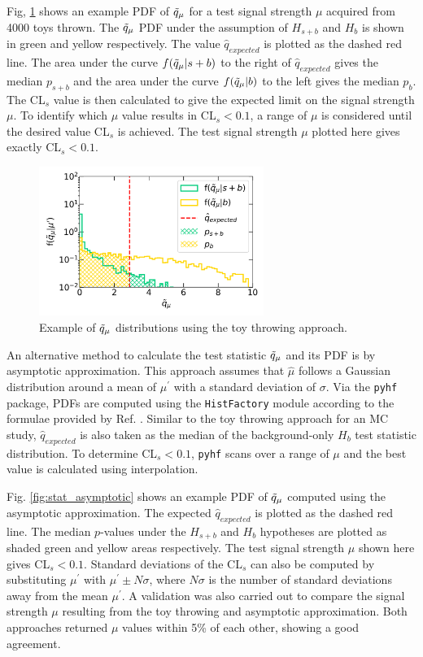 Fig, \ref{fig:stat_toy} shows an example PDF of $\Tilde{q}_\mu$ for a test signal strength $\mu$ acquired from 4000 toys thrown.
The $\Tilde{q}_\mu$ PDF under the assumption of $H_{s+b}$ and $H_b$ is shown in green and yellow respectively.
The value $\hat{q}_{expected}$ is plotted as the dashed red line.
The area under the curve $f(\Tilde{q}_\mu | s + b )$ to the right of $\hat{q}_{expected}$ gives the median $p_{s+b}$ and the area under the curve $f(\Tilde{q}_\mu | b )$ to the left gives the median $p_{b}$.
The CL$_s$ value is then calculated to give the expected limit on the signal strength $\mu$. 
To identify which $\mu$ value results in CL$_s < 0.1$, a range of $\mu$ is considered until the desired value CL$_s$ is achieved.  
The test signal strength $\mu$ plotted here gives exactly CL$_s < 0.1$.
\begin{figure}[hp!] 
\centering    
\includegraphics[width=0.65\textwidth]{toy}
\caption[stat toy]{Example of $\Tilde{q}_\mu$ distributions using the toy throwing approach.}
\label{fig:stat_toy}
\end{figure}

An alternative method to calculate the test statistic $\Tilde{q}_\mu$ and its PDF is by asymptotic approximation.
This approach assumes that $\hat{\mu}$ follows a Gaussian distribution around a mean of $\mu^{\prime}$ with a standard deviation of $\sigma$.
Via the \texttt{pyhf} package, PDFs are computed using the \texttt{HistFactory} module according to the formulae provided by Ref. \cite{asymptotic_test}.
Similar to the toy throwing approach for an MC study, $\hat{q}_{expected}$ is also taken as the median of the background-only $H_b$ test statistic distribution.
To determine CL$_s < 0.1$, \texttt{pyhf} scans over a range of $\mu$ and the best value is calculated using interpolation.

Fig. \ref{fig:stat_asymptotic} shows an example PDF of $\Tilde{q}_\mu$ computed using the asymptotic approximation.
The expected $\hat{q}_{expected}$ is plotted as the dashed red line. 
The median $p$-values under the $H_{s+b}$ and $H_b$ hypotheses are plotted as shaded green and yellow areas respectively.
The test signal strength $\mu$ shown here gives CL$_s < 0.1$.
Standard deviations of the CL$_s$ can also be computed by substituting $\mu^\prime$ with $\mu^{\prime} \pm N\sigma$, where $N\sigma$ is the number of standard deviations away from the mean $\mu^{\prime}$. 
A validation was also carried out to compare the signal strength $\mu$ resulting from the toy throwing and asymptotic approximation.
Both approaches returned $\mu$ values within 5\% of each other, showing a good agreement.

